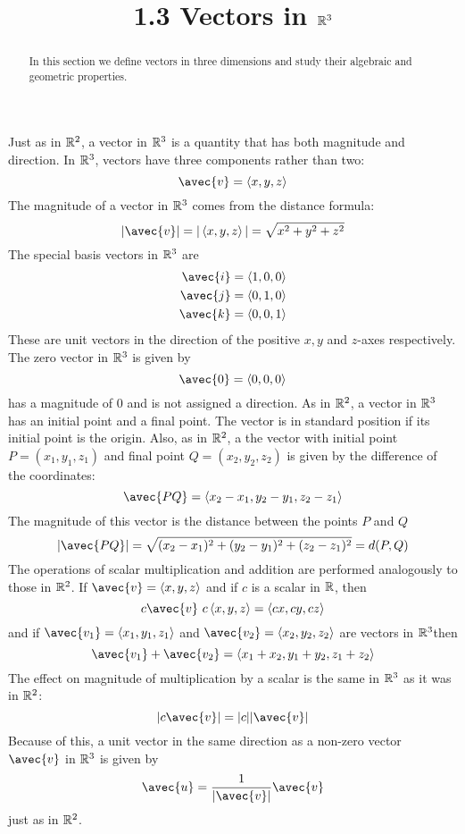 \documentclass[handout]{ximera}
\title{1.3 Vectors in $\mathbb R^3$}
\begin{document}
\begin{abstract}
In this section we define vectors in three dimensions and study their algebraic and geometric properties.
\end{abstract}
 
\maketitle

Just as in $\mathbb R^2$, a vector in $\mathbb R^3$ is a quantity that has both magnitude and direction.
In $\mathbb R^3$, vectors have three components rather than two:
\[
\avec{v} = \vector{x, y, z}
\]
The magnitude of a vector in $\mathbb R^3$ comes from the distance formula:
\[
|\avec{v}| = |\vector{x, y, z}| = \sqrt{x^2 + y^2 + z^2}
\]
The special basis vectors in $\mathbb R^3$ are
\begin{align*}
\avec{i} &= \vector{1, 0, 0}\\
\avec{j} &= \vector{0, 1, 0}\\
\avec{k} &= \vector{0, 0, 1}\\
\end{align*}
These are unit vectors in the direction of the positive $x, y$ and $z$-axes respectively.
The zero vector in $\mathbb R^3$ is given by
\[
\avec{0} = \vector{0,0,0}
\]
has a magnitude of $0$ and is not assigned a direction.
As in $\mathbb R^2$, a vector in $\mathbb R^3$ has an initial point and a final point.  The vector is in standard position if its initial point is the origin.
Also, as in $\mathbb R^2$, a the vector with initial point $P = (x_1, y_1, z_1)$ and final point $Q = (x_2, y_2, z_2)$ is given by the difference of the coordinates:
\[
\avec{PQ} = \vector{x_2 - x_1, y_2-y_1, z_2-z_1}
\]
The magnitude of this vector is the distance between the points $P$ and $Q$
\[
|\avec{PQ}| = \sqrt{(x_2-x_1)^2 + (y_2-y_1)^2 +(z_2-z_1)^2} = d(P, Q)
\]
The operations of scalar multiplication and addition are performed analogously to those in $\mathbb R^2$.
If $\avec{v} = \vector{x, y, z}$ and if $c$ is a scalar in $\mathbb R$, then
\[
c\avec{v} \ c\vector{x, y, z} = \vector{cx, cy, cz}
\]
and if $\avec{v_1} = \vector{x_1, y_1, z_1}$ and $\avec{v_2} = \vector{x_2, y_2, z_2}$ are vectors in $\mathbb R^3$then
\[
\avec{v_1} + \avec{v_2} = \vector{x_1+x_2, y_1+y_2, z_1+z_2}
\]
The effect on magnitude of multiplication by a scalar is the same in $\mathbb R^3$ as it was in $\mathbb R^2$:
\[
|c\avec{v}| = |c| |\avec{v}|
\]
Because of this, a unit vector in the same direction as a non-zero vector $\avec{v}$ in $\mathbb R^3$ is given by
\[
\avec{u} = \frac{1}{|\avec{v}|} \avec{v}
\]
just as in $\mathbb R^2$.
\end{document}
